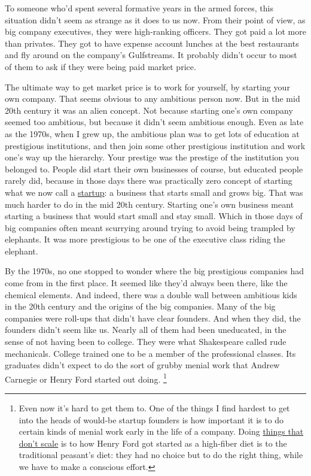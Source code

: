 To someone who'd spent several formative years in the armed forces, this
situation didn't seem as strange as it does to us now. From their point
of view, as big company executives, they were high-ranking officers.
They got paid a lot more than privates. They got to have expense account
lunches at the best restaurants and fly around on the company's
Gulfstreams. It probably didn't occur to most of them to ask if they
were being paid market price.

The ultimate way to get market price is to work for yourself, by
starting your own company. That seems obvious to any ambitious person
now. But in the mid 20th century it was an alien concept. Not because
starting one's own company seemed too ambitious, but because it didn't
seem ambitious enough. Even as late as the 1970s, when I grew up, the
ambitious plan was to get lots of education at prestigious institutions,
and then join some other prestigious institution and work one's way up
the hierarchy. Your prestige was the prestige of the institution you
belonged to. People did start their own businesses of course, but
educated people rarely did, because in those days there was practically
zero concept of starting what we now call a \href{growth.html}{startup}:
a business that starts small and grows big. That was much harder to do
in the mid 20th century. Starting one's own business meant starting a
business that would start small and stay small. Which in those days of
big companies often meant scurrying around trying to avoid being
trampled by elephants. It was more prestigious to be one of the
executive class riding the elephant.

By the 1970s, no one stopped to wonder where the big prestigious
companies had come from in the first place. It seemed like they'd always
been there, like the chemical elements. And indeed, there was a double
wall between ambitious kids in the 20th century and the origins of the
big companies. Many of the big companies were roll-ups that didn't have
clear founders. And when they did, the founders didn't seem like us.
Nearly all of them had been uneducated, in the sense of not having been
to college. They were what Shakespeare called rude mechanicals. College
trained one to be a member of the professional classes. Its graduates
didn't expect to do the sort of grubby menial work that Andrew Carnegie
or Henry Ford started out doing. \footnote{Even now it's hard to get them to. One of the things I find
hardest to get into the heads of would-be startup founders is how
important it is to do certain kinds of menial work early in the life of
a company. Doing \href{ds.html}{things that don't scale} is to how Henry
Ford got started as a high-fiber diet is to the traditional peasant's
diet: they had no choice but to do the right thing, while we have to
make a conscious effort.}

